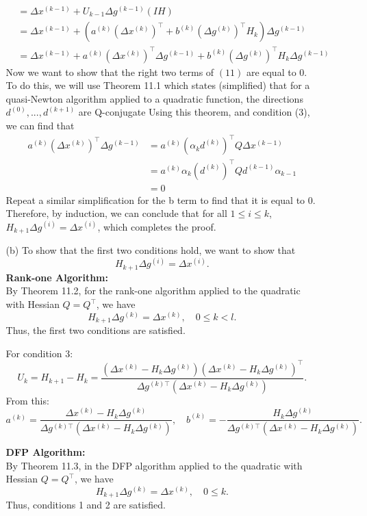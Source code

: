 \documentclass{article}
\begin{document}
\begin{enumerate}
\begin{enumerate}
\begin{align}
&= \Delta x^{(k-1)} + U_{k-1}\Delta g^{(k-1)} (IH)\\
&= \Delta x^{(k-1)} + (a^{(k)} (\Delta x^{(k)})^\top + b^{(k)} (\Delta g^{(k)})^\top H_k) \Delta g^{(k-1)}  \\
&=  \Delta x^{(k-1)} + a^{(k)} (\Delta x^{(k)})^\top\Delta g^{(k-1)}  + b^{(k)} (\Delta g^{(k)})^\top H_k \Delta g^{(k-1)}
\end{align}
Now we want to show that the right two terms of $(11)$ are equal to 0.\\
To do this, we will use Theorem 11.1 which states (simplified) that for a quasi-Newton algorithm applied to a quadratic function, the directions $d^{(0)},..., d^{(k+1)}$ are Q-conjugate  
Using this theorem, and condition (3), we can find that 
\begin{align*}
  a^{(k)} (\Delta x^{(k)})^\top\Delta g^{(k-1)} &= a^{(k)} (\alpha_k d^{(k)})^\top Q \Delta x^{(k-1)}\\
  &= a^{(k)} \alpha_k (d^{(k)})^\top Q d^{(k-1)}\alpha_{k-1}\\
  &= 0
\end{align*}
Repeat a similar simplification for the b term to find that it is equal to 0.\\
Therefore, by induction, we can conclude that for all $1 \leq i \leq k$, $H_{k+1}\Delta g^{(i)} = \Delta x^{(i)}$, which completes the proof.

\item[(b)]
To show that the first two conditions hold, we want to show that 
\[
H_{k+1} \Delta g^{(i)} = \Delta x^{(i)}.
\]
\textbf{Rank-one Algorithm:} \\
By Theorem 11.2, for the rank-one algorithm applied to the quadratic with Hessian $Q = Q^\top$, we have 
\[
H_{k+1} \Delta g^{(k)} = \Delta x^{(k)}, \quad 0 \leq k < l.
\]
Thus, the first two conditions are satisfied.

For condition 3:
\[
U_k = H_{k+1} - H_k = 
\frac{(\Delta x^{(k)} - H_k \Delta g^{(k)}) (\Delta x^{(k)} - H_k \Delta g^{(k)})^\top}{\Delta g^{(k)\top} (\Delta x^{(k)} - H_k \Delta g^{(k)})}.
\]
From this:
\[
a^{(k)} = \frac{\Delta x^{(k)} - H_k \Delta g^{(k)}}{\Delta g^{(k)\top} (\Delta x^{(k)} - H_k \Delta g^{(k)})}, \quad 
b^{(k)} = -\frac{H_k \Delta g^{(k)}}{\Delta g^{(k)\top} (\Delta x^{(k)} - H_k \Delta g^{(k)})}.
\]

\textbf{DFP Algorithm:} \\
By Theorem 11.3, in the DFP algorithm applied to the quadratic with Hessian $Q = Q^\top$, we have 
\[
H_{k+1} \Delta g^{(k)} = \Delta x^{(k)}, \quad 0 \leq k.
\]
Thus, conditions 1 and 2 are satisfied.


\end{enumerate}
\end{enumerate}
\end{document}
